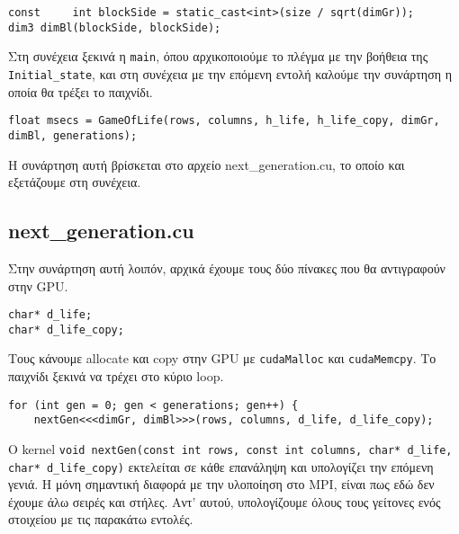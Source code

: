 \begin{tcolorbox}
\begin{verbatim}
const     int blockSide = static_cast<int>(size / sqrt(dimGr));
dim3 dimBl(blockSide, blockSide);
\end{verbatim}
\end{tcolorbox}

Στη συνέχεια ξεκινά η \texttt{main}, όπου αρχικοποιούμε το πλέγμα με την βοήθεια της \texttt{Initial_state}, και στη συνέχεια με την επόμενη εντολή καλούμε την συνάρτηση η οποία θα τρέξει το παιχνίδι.

\begin{tcolorbox}
\texttt{float msecs = GameOfLife(rows, columns, h_life, h_life_copy, dimGr, dimBl, generations);}
\end{tcolorbox}

Η συνάρτηση αυτή βρίσκεται στο αρχείο next\_generation.cu, το οποίο και εξετάζουμε στη συνέχεια.
\subsection{next\_generation.cu}
Στην συνάρτηση αυτή λοιπόν, αρχικά έχουμε τους δύο πίνακες που θα αντιγραφούν στην GPU.

\begin{tcolorbox}
\begin{verbatim}
char* d_life;
char* d_life_copy;
\end{verbatim}
\end{tcolorbox}

Τους κάνουμε allocate και copy στην GPU με \texttt{cudaMalloc} και \texttt{cudaMemcpy}. Το παιχνίδι ξεκινά να τρέχει στο κύριο loop.

\begin{tcolorbox}
\begin{verbatim}
for (int gen = 0; gen < generations; gen++) {
    nextGen<<<dimGr, dimBl>>>(rows, columns, d_life, d_life_copy);
\end{verbatim}
\end{tcolorbox}

Ο kernel \texttt{void nextGen(const int rows, const int columns, char* d_life, char* d_life_copy)} εκτελείται σε κάθε επανάληψη και υπολογίζει την επόμενη γενιά. Η μόνη σημαντική διαφορά με την υλοποίηση στο MPI, είναι πως εδώ δεν έχουμε άλω σειρές και στήλες. Αντ' αυτού, υπολογίζουμε όλους τους γείτονες ενός στοιχείου με τις παρακάτω εντολές.

